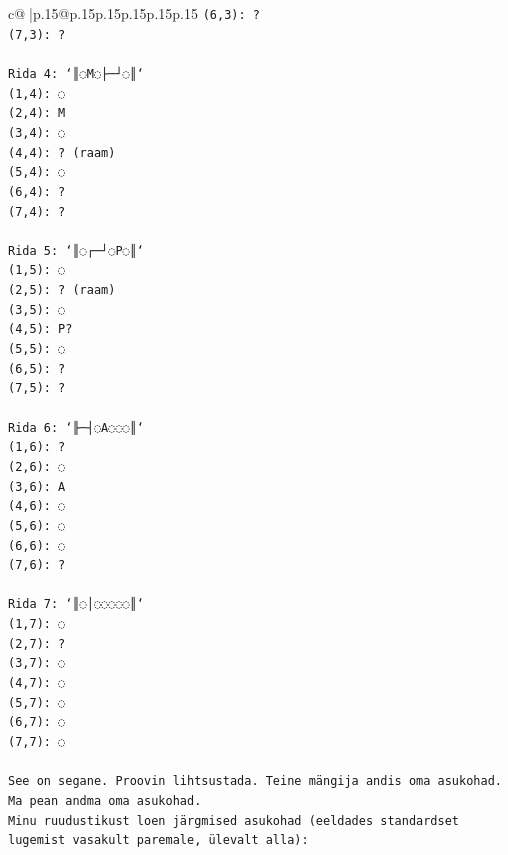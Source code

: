 \documentclass{article}
\begin{document}
{\begin{supertabular}{c@{$\;$}|p{.15\linewidth}@{}p{.15\linewidth}p{.15\linewidth}p{.15\linewidth}p{.15\linewidth}p{.15\linewidth}}
{{{\texttt{(6,3): ?} \\
\texttt{(7,3): ?} \\
\\ 
\texttt{Rida 4: `║◌M◌├─┘◌║`} \\
\texttt{(1,4): ◌} \\
\texttt{(2,4): M} \\
\texttt{(3,4): ◌} \\
\texttt{(4,4): ? (raam)} \\
\texttt{(5,4): ◌} \\
\texttt{(6,4): ?} \\
\texttt{(7,4): ?} \\
\\ 
\texttt{Rida 5: `║◌┌─┘◌P◌║`} \\
\texttt{(1,5): ◌} \\
\texttt{(2,5): ? (raam)} \\
\texttt{(3,5): ◌} \\
\texttt{(4,5): P?} \\
\texttt{(5,5): ◌} \\
\texttt{(6,5): ?} \\
\texttt{(7,5): ?} \\
\\ 
\texttt{Rida 6: `╟─┤◌A◌◌◌║`} \\
\texttt{(1,6): ?} \\
\texttt{(2,6): ◌} \\
\texttt{(3,6): A} \\
\texttt{(4,6): ◌} \\
\texttt{(5,6): ◌} \\
\texttt{(6,6): ◌} \\
\texttt{(7,6): ?} \\
\\ 
\texttt{Rida 7: `║◌│◌◌◌◌◌║`} \\
\texttt{(1,7): ◌} \\
\texttt{(2,7): ?} \\
\texttt{(3,7): ◌} \\
\texttt{(4,7): ◌} \\
\texttt{(5,7): ◌} \\
\texttt{(6,7): ◌} \\
\texttt{(7,7): ◌} \\
\\ 
\texttt{See on segane. Proovin lihtsustada. Teine mängija andis oma asukohad. Ma pean andma oma asukohad.} \\
\texttt{Minu ruudustikust loen järgmised asukohad (eeldades standardset lugemist vasakult paremale, ülevalt alla):} \\
}}}
\end{supertabular}}
\end{document}
